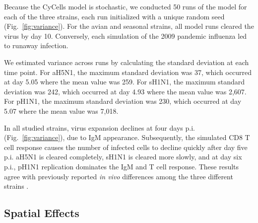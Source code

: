 \documentclass[10pt]{article}
\begin{document}
Because the CyCells model is stochastic, we conducted 50 runs of the model for each of the three strains, each run initialized with a unique random seed (Fig.~\ref{fig:variance}).  For the avian and seasonal strains, all model runs cleared the virus by day 10.  Conversely, each simulation of the 2009 pandemic influenza led to runaway infection.


We estimated variance across runs by calculating the standard deviation at each time point.  For aH5N1, the maximum standard deviation was 37, which occurred at day 5.05 where the mean value was 259.  For sH1N1, the maximum standard deviation was 242, which occurred at day 4.93 where the mean value was 2,607.  For pH1N1, the maximum standard deviation was 230, which occurred at day 5.07 where the mean value was 7,018.

In all studied strains, virus expansion declines at four days p.i. (Fig.~\ref{fig:variance}), due to IgM appearance.  Subsequently, the simulated CD8 T cell response causes the number of infected cells to decline quickly after day five p.i.  aH5N1 is cleared completely, sH1N1 is cleared more slowly, and at day six p.i., pH1N1 replication dominates the IgM and T cell response.  These results agree with previously reported \textit{in vivo} differences among the three different strains \cite{Mitchell2011}.



\subsection*{Spatial Effects}
\end{document}
